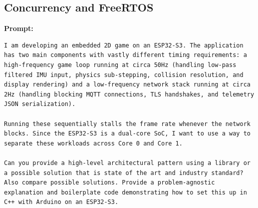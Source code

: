 \subsection*{Concurrency and FreeRTOS}

\textbf{Prompt:}
\begin{lstlisting}[language={}, breaklines=true]
I am developing an embedded 2D game on an ESP32-S3. The application has two main components with vastly different timing requirements: a high-frequency game loop running at circa 50Hz (handling low-pass filtered IMU input, physics sub-stepping, collision resolution, and display rendering) and a low-frequency network stack running at circa 2Hz (handling blocking MQTT connections, TLS handshakes, and telemetry JSON serialization).

Running these sequentially stalls the frame rate whenever the network blocks. Since the ESP32-S3 is a dual-core SoC, I want to use a way to separate these workloads across Core 0 and Core 1.

Can you provide a high-level architectural pattern using a library or a possible solution that is state of the art and industry standard?
Also compare possible solutions. Provide a problem-agnostic explanation and boilerplate code demonstrating how to set this up in C++ with Arduino on an ESP32-S3.
\end{lstlisting}

